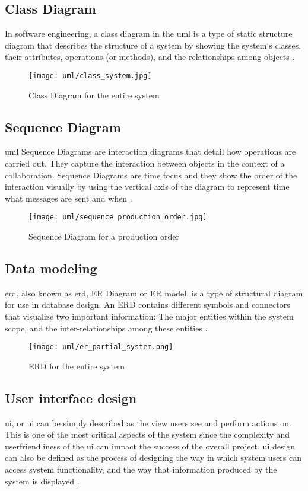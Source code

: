 \documentclass[12pt]{report}
\begin{document}
\newpage
\subsection{Class Diagram}
In software engineering, a class diagram in the \acrfull{uml} is a type of static structure diagram that describes the structure of a system by showing the system's classes, their attributes, operations (or methods), and the relationships among objects \cite{paradigm_2018_uml}.

\begin{figure}[H]
	\centering
	\texttt{[image: uml/class\_system.jpg]}
	\caption{Class Diagram for the entire system}
\end{figure}

\newpage
\subsection{Sequence Diagram}
\acrshort{uml} Sequence Diagrams are interaction diagrams that detail how operations are carried out. They capture the interaction between objects in the context of a collaboration. Sequence Diagrams are time focus and they show the order of the interaction visually by using the vertical axis of the diagram to represent time what messages are sent and when \cite{paradigm_2018_uml}.

\begin{figure}[H]
	\centering
	\texttt{[image: uml/sequence\_production\_order.jpg]}
	\caption{Sequence Diagram for a production order}
\end{figure}

\newpage
\subsection{Data modeling}
\acrlong{erd}, also known as \acrshort{erd}, ER Diagram or ER model, is a type of structural diagram for use in database design. An ERD contains different symbols and connectors that visualize two important information: The major entities within the system scope, and the inter-relationships among these entities \cite{paradigm_2018_uml}.

\begin{figure}[H]
	\centering
	\texttt{[image: uml/er\_partial\_system.png]}
	\caption{ERD for the entire system}
\end{figure}

\subsection{User interface design}
\acrlong{ui}, or \acrshort{ui} can be simply described as the view users see and perform actions on. This is one of the most critical aspects of the system since the complexity and user­friendliness of the \acrshort{ui} can impact the success of the overall project. \acrshort{ui} design can also be defined as the process of designing the way in which system users can access system functionality, and the way that information produced by the system is displayed \cite{sommerville_2008_software}.
\end{document}

